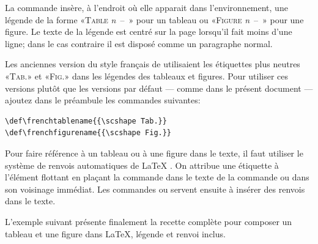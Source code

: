 La commande \cmd{\caption} insère,  à l'endroit où elle
apparait dans l'environnement, une légende de la forme «\textsc{Table}
\emph{n}~--~» pour un tableau ou «\textsc{Figure}
\emph{n}~--~» pour une figure. Le texte de la légende est
centré sur la page lorsqu'il fait moins d'une ligne; dans le cas
contraire il est disposé comme un paragraphe normal.

\begin{conseil}
  Les anciennes version du style français de  utilisaient
  les étiquettes plus neutres «\textsc{Tab.}» et «\textsc{Fig.}» dans
  les légendes des tableaux et figures. Pour utiliser ces versions
  plutôt que les versions par défaut --- comme dans le présent
  document --- ajoutez dans le préambule les commandes suivantes:
\begin{lstlisting}
\def\frenchtablename{{\scshape Tab.}}
\def\frenchfigurename{{\scshape Fig.}}
\end{lstlisting}
\end{conseil}

Pour faire référence à un tableau ou à une figure dans le texte, il
faut utiliser le système de renvois automatiques de {\LaTeX}
\citep[section~4]{UL:latex:1}. On attribue une étiquette à l'élément
flottant en plaçant la commande \cmd{\label} dans le texte de la
commande \cmd{\caption} ou dans son voisinage immédiat. Les commandes
\cmd{\ref} ou \cmd{\autoref} servent ensuite à insérer des renvois dans
le texte.

L'exemple suivant présente finalement la recette complète pour composer
un tableau et une figure dans {\LaTeX}, légende et renvoi inclus.


